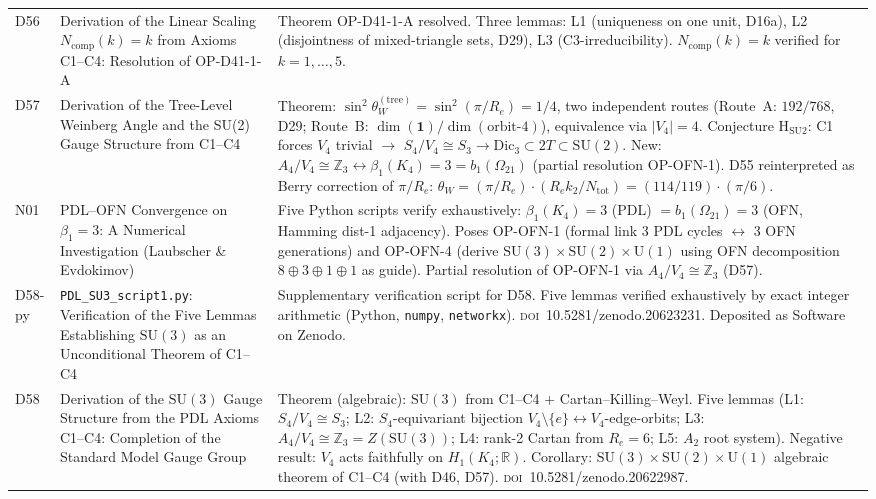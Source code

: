 \documentclass[11pt,a4paper]{article}
\theoremstyle{plain}
\theoremstyle{definition}
\theoremstyle{remark}
\newcommand{\Kfour}{K_4}
\begin{document}
\begin{longtable}{L{1.3cm}L{3.8cm}L{8.0cm}}
D56 & Derivation of the Linear Scaling $N_{\mathrm{comp}}(k)=k$ from Axioms C1--C4: Resolution of OP-D41-1-A~\cite{D56} & \textcolor{proofblue}{Theorem} OP-D41-1-A resolved. Three lemmas: L1 (uniqueness on one unit, D16a), L2 (disjointness of mixed-triangle sets, D29), L3 (C3-irreducibility). $N_{\mathrm{comp}}(k)=k$ verified for $k=1,\ldots,5$.\\[0.4em]
D57 & Derivation of the Tree-Level Weinberg Angle and the SU(2) Gauge Structure from C1--C4~\cite{D57} & \textcolor{proofblue}{Theorem}: $\sin^2\theta_W^{(\mathrm{tree})} = \sin^2(\pi/R_e) = 1/4$, two independent routes (Route~A: $192/768$, D29; Route~B: $\dim(\mathbf{1})/\dim(\text{orbit-4})$), equivalence via $|V_4|=4$. \textcolor{conjecturegreen}{Conjecture} H$_{\mathrm{SU2}}$: C1 forces $V_4$ trivial $\to$ $S_4/V_4 \cong S_3 \to \mathrm{Dic}_3 \subset 2T \subset \mathrm{SU}(2)$. New: $A_4/V_4 \cong \mathbb{Z}_3 \leftrightarrow \beta_1(\Kfour)=3=b_1(\Omega_{21})$ (partial resolution OP-OFN-1). D55 reinterpreted as Berry correction of $\pi/R_e$: $\theta_W = (\pi/R_e)\cdot(R_e k_2/N_{\mathrm{tot}}) = (114/119)\cdot(\pi/6)$.\\[0.4em]
N01 & PDL--OFN Convergence on $\beta_1=3$: A Numerical Investigation (Laubscher \& Evdokimov)~\cite{N01} & Five Python scripts verify exhaustively: $\beta_1(\Kfour)=3$ (PDL) $= b_1(\Omega_{21})=3$ (OFN, Hamming dist-1 adjacency). Poses OP-OFN-1 (formal link 3 PDL cycles $\leftrightarrow$ 3 OFN generations) and OP-OFN-4 (derive $\mathrm{SU}(3)\times\mathrm{SU}(2)\times\mathrm{U}(1)$ using OFN decomposition $8\oplus3\oplus1\oplus1$ as guide). Partial resolution of OP-OFN-1 via $A_4/V_4 \cong \mathbb{Z}_3$ (D57).\\[0.4em]
D58-py & \texttt{PDL\_SU3\_script1.py}: Verification of the Five Lemmas Establishing $\mathrm{SU}(3)$ as an Unconditional Theorem of C1--C4~\cite{D58py} & Supplementary verification script for D58. Five lemmas verified exhaustively by exact integer arithmetic (Python, \texttt{numpy}, \texttt{networkx}). \textsc{doi}~10.5281/zenodo.20623231. Deposited as Software on Zenodo.\\[0.4em]
D58 & Derivation of the $\mathrm{SU}(3)$ Gauge Structure from the PDL Axioms C1--C4: Completion of the Standard Model Gauge Group~\cite{D58} & \textcolor{proofblue}{Theorem} (algebraic): $\mathrm{SU}(3)$ from C1--C4 + Cartan--Killing--Weyl. Five lemmas (L1: $S_4/V_4\cong S_3$; L2: $S_4$-equivariant bijection $V_4\setminus\{e\}\leftrightarrow V_4$-edge-orbits; L3: $A_4/V_4\cong\mathbb{Z}_3 = Z(\mathrm{SU}(3))$; L4: rank-2 Cartan from $R_e=6$; L5: $A_2$ root system). Negative result: $V_4$ acts faithfully on $H_1(K_4;\mathbb{R})$. Corollary: $\mathrm{SU}(3)\times\mathrm{SU}(2)\times\mathrm{U}(1)$ algebraic theorem of C1--C4 (with D46, D57). \textsc{doi}~10.5281/zenodo.20622987.\\[0.4em]

\end{longtable}
\end{document}
